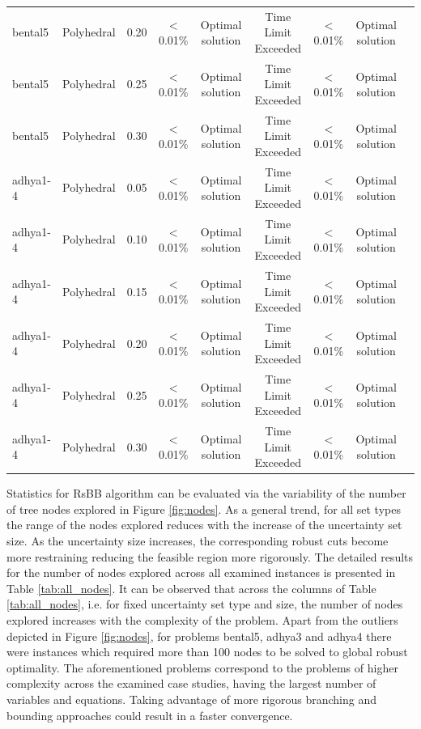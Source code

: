\documentclass[sn-mathphys-num]{sn-jnl}
\begin{document}
\begin{table}
\begin{tabular}{llccccccc}
bental5 & Polyhedral & 0.20 & $<$0.01\% & Optimal solution  & Time Limit Exceeded & $<$0.01\% & Optimal solution \\
bental5 & Polyhedral & 0.25 & $<$0.01\% & Optimal solution  & Time Limit Exceeded & $<$0.01\% & Optimal solution \\
bental5 & Polyhedral & 0.30 & $<$0.01\% & Optimal solution  & Time Limit Exceeded & $<$0.01\% & Optimal solution \\
adhya1-4 & Polyhedral & 0.05 & $<$0.01\% & Optimal solution  & Time Limit Exceeded & $<$0.01\% & Optimal solution \\
adhya1-4 & Polyhedral & 0.10 & $<$0.01\% & Optimal solution  & Time Limit Exceeded & $<$0.01\% & Optimal solution \\
adhya1-4 & Polyhedral & 0.15 & $<$0.01\% & Optimal solution  & Time Limit Exceeded & $<$0.01\% & Optimal solution \\
adhya1-4 & Polyhedral & 0.20 & $<$0.01\% & Optimal solution  & Time Limit Exceeded & $<$0.01\% & Optimal solution \\
adhya1-4 & Polyhedral & 0.25 & $<$0.01\% & Optimal solution  & Time Limit Exceeded & $<$0.01\% & Optimal solution \\
adhya1-4 & Polyhedral & 0.30 & $<$0.01\% & Optimal solution  & Time Limit Exceeded & $<$0.01\% & Optimal solution \\
\bottomrule
\end{tabular}
\label{tab:dual_pyros_rsbb}
\end{table}

Statistics for RsBB algorithm can be evaluated via the variability of the number of tree nodes explored in Figure \ref{fig:nodes}. As a general trend, for all set types the range of the nodes explored reduces with the increase of the uncertainty set size. As the uncertainty size increases, the corresponding robust cuts become more restraining reducing the feasible region more rigorously. The detailed results for the number of nodes explored across all examined instances is presented in Table \ref{tab:all_nodes}. It can be observed that across the columns of Table \ref{tab:all_nodes}, i.e. for fixed uncertainty set type and size, the number of nodes explored increases with the complexity of the problem. Apart from the outliers depicted in Figure \ref{fig:nodes}, for problems bental5, adhya3 and adhya4 there were instances which required more than 100 nodes to be solved to global robust optimality. The aforementioned problems correspond to the problems of higher complexity across the examined case studies, having the largest number of variables and equations. Taking advantage of more rigorous branching and bounding approaches could result in a faster convergence. 
\end{document}
